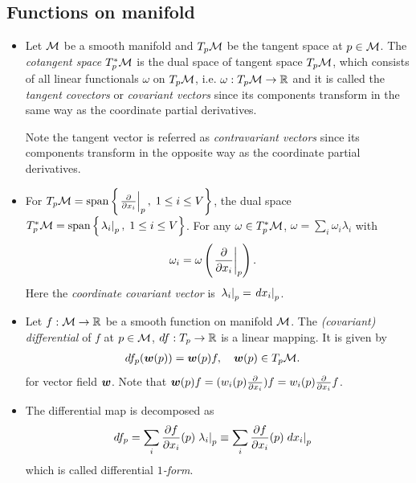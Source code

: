 \documentclass[11pt]{article}
\begin{document}
\subsection{Functions on manifold}
\begin{itemize}
\item \begin{definition}\citep{lee2003introduction}
Let ${\mathcal M}$ be a smooth manifold and $T_{p}{\mathcal M}$ be the tangent space at $p\in {\mathcal M}$. The \emph{cotangent space} $T^{*}_{p}{\mathcal M}$ is the dual space of tangent space $T_{p}{\mathcal M}$, which consists of all linear functionals $\omega$ on $T_{p}{\mathcal M}$, i.e. $\omega: T_{p}{\mathcal M}\rightarrow {\mathbb R}$ and it is called the\emph{ tangent covectors} or \emph{covariant vectors} since its components transform in the same way as the coordinate partial derivatives. 
\end{definition}
Note the tangent vector is referred as \emph{contravariant vectors} since its components transform in the opposite way as the coordinate partial derivatives.  

\item For $T_{p}{\mathcal M} = \text{span}\left\{ \left.{\frac{\partial }{ \partial x_{i}}}\right\vert_{p},\; 1\le i\le V\right\}$, the dual space $T^{*}_{p}{\mathcal M}= \text{span}\left\{ \left.{\lambda_{i}}\right\vert_{p},\; 1\le i\le V\right\}$. For any $\omega \in T^{*}_{p}{\mathcal M}$, $\omega =\sum_{i} \omega_{i}\lambda_{i}$ with 
\begin{align*}
\omega_{i} &= \omega\left(\left.{\frac{\partial }{ \partial x_{i}}}\right\vert_{p}\right).
\end{align*} Here the \emph{coordinate covariant vector} is $\left.{\lambda_{i}}\right\vert_{p}= \left.{dx_{i}}\right\vert_{p}$.

\item Let $f: {\mathcal M} \rightarrow {\mathbb R}$ be a smooth function on manifold ${\mathcal M}$. The \emph{(covariant) differential} of $f$ at $p\in {\mathcal M}$, $df: T_{p} \rightarrow {\mathbb R}$ is a linear mapping. It is given by 
\begin{align*}
df_{p}(\boldsymbol{w}(p)) &= \boldsymbol{w}(p)f, \quad \boldsymbol{w}(p) \in T_{p}{\mathcal M}.
\end{align*} for vector field $\boldsymbol{w}$. Note that $\boldsymbol{w}(p)f= (w_{i}(p)\frac{\partial }{ \partial x_{i}})f=w_{i}(p)\frac{\partial }{ \partial x_{i}}f$.

\item The differential map is decomposed as
\begin{align*}
df_{p} &= \sum_{i} \frac{\partial f}{ \partial x_{i}}(p)\left.{\lambda_{i}}\right\vert_{p} \equiv \sum_{i} \frac{\partial f}{ \partial x_{i}}(p)\left.{dx_{i}}\right\vert_{p}
\end{align*} which is called differential \emph{$1$-form}.\\


\end{itemize}
\end{document}
